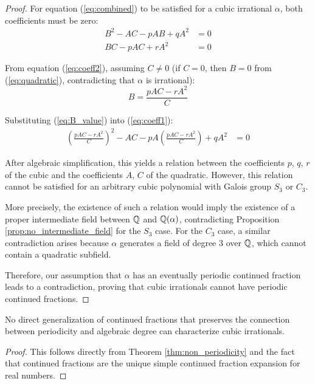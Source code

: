 \begin{proof}
For equation (\ref{eq:combined}) to be satisfied for a cubic irrational $\alpha$, both coefficients must be zero:
\begin{align}
B^2 - AC - pAB + qA^2 &= 0 \label{eq:coeff1}\\
BC - pAC + rA^2 &= 0 \label{eq:coeff2}
\end{align}

From equation (\ref{eq:coeff2}), assuming $C \neq 0$ (if $C = 0$, then $B = 0$ from (\ref{eq:quadratic}), contradicting that $\alpha$ is irrational):
\begin{equation}\label{eq:B_value}
B = \frac{pAC - rA^2}{C}
\end{equation}

Substituting (\ref{eq:B_value}) into (\ref{eq:coeff1}):
\begin{align*}
\left(\frac{pAC - rA^2}{C}\right)^2 - AC - pA\left(\frac{pAC - rA^2}{C}\right) + qA^2 &= 0
\end{align*}

After algebraic simplification, this yields a relation between the coefficients $p$, $q$, $r$ of the cubic and the coefficients $A$, $C$ of the quadratic. However, this relation cannot be satisfied for an arbitrary cubic polynomial with Galois group $S_3$ or $C_3$.

More precisely, the existence of such a relation would imply the existence of a proper intermediate field between $\mathbb{Q}$ and $\mathbb{Q}(\alpha)$, contradicting Proposition \ref{prop:no_intermediate_field} for the $S_3$ case. For the $C_3$ case, a similar contradiction arises because $\alpha$ generates a field of degree 3 over $\mathbb{Q}$, which cannot contain a quadratic subfield.

Therefore, our assumption that $\alpha$ has an eventually periodic continued fraction leads to a contradiction, proving that cubic irrationals cannot have periodic continued fractions.
\end{proof}

\begin{corollary}\label{cor:cf_insufficient}
No direct generalization of continued fractions that preserves the connection between periodicity and algebraic degree can characterize cubic irrationals.
\end{corollary}

\begin{proof}
This follows directly from Theorem \ref{thm:non_periodicity} and the fact that continued fractions are the unique simple continued fraction expansion for real numbers.
\end{proof}

